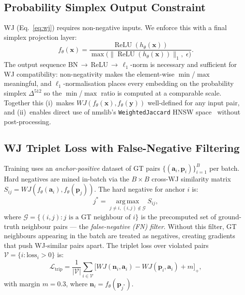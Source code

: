 \documentclass[sigconf]{acmart}
\begin{document}
\subsection{Probability Simplex Output Constraint}

WJ (Eq.~\ref{eq:wj}) requires non-negative inputs. We enforce this with a final
simplex projection layer:
\begin{equation}
  f_\theta(\mathbf{x}) = \frac{\operatorname{ReLU}(h_\theta(\mathbf{x}))}
                              {\max\!\bigl(\|\operatorname{ReLU}(h_\theta(\mathbf{x}))\|_1,\;\epsilon\bigr)}.
  \label{eq:simplex}
\end{equation}
The output sequence BN\,$\to$\,ReLU\,$\to$\,$\ell_1$-norm is necessary and
sufficient for WJ compatibility: non-negativity makes the element-wise
$\min$/$\max$ meaningful, and $\ell_1$-normalisation places every embedding on
the probability simplex $\Delta^{512}$ so the $\min$/$\max$ ratio is computed at
a comparable scale. Together this (i)~makes
$WJ(f_\theta(\mathbf{x}), f_\theta(\mathbf{y}))$ well-defined for any input pair,
and (ii)~enables direct use of nmslib's \texttt{WeightedJaccard} HNSW
space~\cite{shape2vec} without post-processing.

\subsection{WJ Triplet Loss with False-Negative Filtering}
\label{sec:triplet}

Training uses an \emph{anchor-positive} dataset of GT pairs
$\{(\mathbf{a}_i, \mathbf{p}_i)\}_{i=1}^B$ per batch.
Hard negatives are mined in-batch via the $B \times B$ cross-WJ similarity matrix
$S_{ij} = WJ(f_\theta(\mathbf{a}_i), f_\theta(\mathbf{p}_j))$.
The hard negative for anchor $i$ is:
\begin{equation}
  j^* = \operatorname*{arg\,max}_{j \neq i,\, (i,j) \notin \mathcal{G}} S_{ij},
  \label{eq:hardneg}
\end{equation}
where $\mathcal{G} = \{(i,j) : j \text{ is a GT neighbour of } i\}$ is the
precomputed set of ground-truth neighbour pairs --- the \emph{false-negative (FN)
filter}.
Without this filter, GT neighbours appearing in the batch are treated as negatives,
creating gradients that push WJ-similar pairs apart.
The triplet loss over violated pairs $\mathcal{V} = \{i : \text{loss}_i > 0\}$ is:
\begin{equation}
  \mathcal{L}_{\text{trip}} = \frac{1}{|\mathcal{V}|}
    \sum_{i \in \mathcal{V}} \bigl[WJ(\mathbf{n}_i, \mathbf{a}_i)
    - WJ(\mathbf{p}_i, \mathbf{a}_i) + m\bigr]_{+},
  \label{eq:triplet}
\end{equation}
with margin $m = 0.3$, where $\mathbf{n}_i = f_\theta(\mathbf{p}_{j^*})$.
\end{document}
